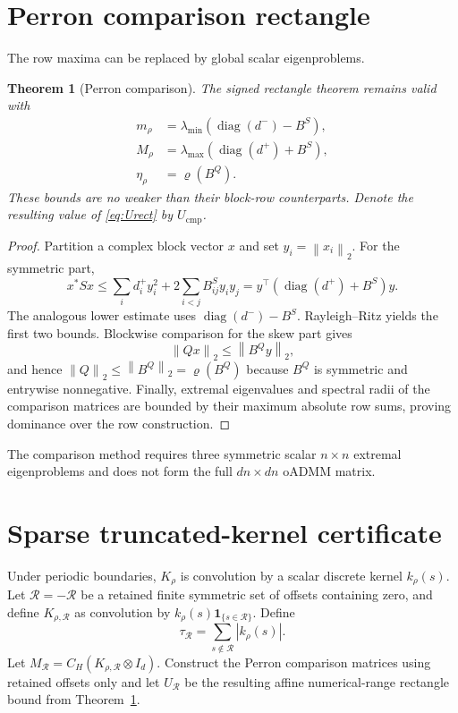 \documentclass[11pt]{article}
\newtheorem{theorem}{Theorem}[section]
\newcommand{\norm}[1]{\left\lVert #1\right\rVert}
\newcommand{\spr}{\varrho}
\newcommand{\diag}{\operatorname{diag}}
\newcommand{\Ucmp}{U_{\mathrm{cmp}}}
\begin{document}
\section{Perron comparison rectangle}\label{sec:perron}
The row maxima can be replaced by global scalar eigenproblems.
\begin{theorem}[Perron comparison]\label{thm:perron}
The signed rectangle theorem remains valid with
\begin{equation}
\begin{aligned}
m_\rho&=\lambda_{\min}\left(\diag(d^-)-B^S\right),\\
M_\rho&=\lambda_{\max}\left(\diag(d^+)+B^S\right),\\
\eta_\rho&=\spr(B^Q).
\end{aligned}
\label{eq:perron}
\end{equation}
These bounds are no weaker than their block-row counterparts. Denote the
resulting value of \eqref{eq:Urect} by $\Ucmp$.
\end{theorem}
\begin{proof}
Partition a complex block vector $x$ and set $y_i=\norm{x_i}_2$. For the
symmetric
part,
\[
x^*Sx
\le\sum_i d_i^+y_i^2
+2\sum_{i<j}B^S_{ij}y_iy_j
=y^\top(\diag(d^+)+B^S)y.
\]
The analogous lower estimate uses $\diag(d^-)-B^S$. Rayleigh--Ritz yields the
first two bounds. Blockwise comparison for the skew part gives
\[
\norm{Qx}_2\le\norm{B^Qy}_2,
\]
and hence
$\norm Q_2\le\norm{B^Q}_2=\spr(B^Q)$ because $B^Q$ is symmetric and
entrywise nonnegative. Finally, extremal eigenvalues and spectral radii of the
comparison matrices are bounded by their maximum absolute row sums, proving
dominance over the row construction.
\end{proof}
The comparison method requires three symmetric scalar $n\times n$ extremal
eigenproblems and does not form the full $dn\times dn$ oADMM matrix.

\section{Sparse truncated-kernel certificate}\label{sec:truncated}
Under periodic boundaries, $K_\rho$ is convolution by a scalar discrete kernel
$k_\rho(s)$. Let $\mathcal R=-\mathcal R$ be a retained finite symmetric set of
offsets containing zero, and define $K_{\rho,\mathcal R}$ as convolution by
$k_\rho(s)\mathbf 1_{\{s\in\mathcal R\}}$. Define
\[
\tau_{\mathcal R}=\sum_{s\notin\mathcal R}|k_\rho(s)|.
\]
Let $M_{\mathcal R}=C_H(K_{\rho,\mathcal R}\otimes I_d)$. Construct the Perron
comparison matrices using retained offsets only and let $U_{\mathcal R}$ be the
resulting affine numerical-range rectangle bound from
Theorem~\ref{thm:perron}.
\end{document}
